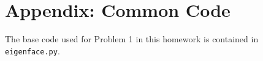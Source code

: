\documentclass[aps,letterpaper,10pt]{article}
\newcommand{\ttt}{\texttt}
\begin{document}
\newpage
\section{Appendix: Common Code}
The base code used for Problem 1 in this homework is contained in \ttt{eigenface.py}.

\end{document}

